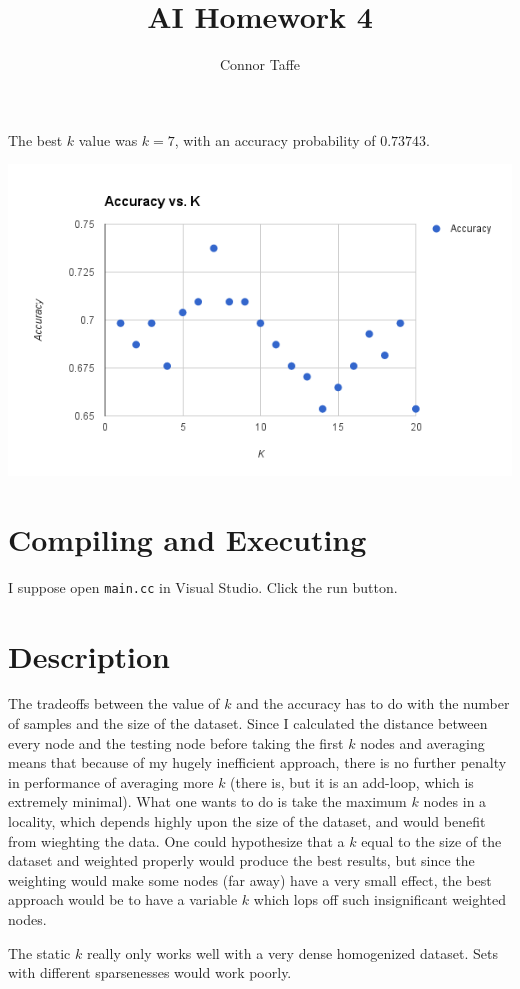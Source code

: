 \documentclass{article}
\title{AI Homework 4}
\author{Connor Taffe}
\begin{document}
  \maketitle

  The best $k$ value was $k=7$, with an accuracy probability of $0.73743$.

  {\centering\includegraphics[width=\textwidth]{image}}

  \section{Compiling and Executing}

  I suppose open {\tt main.cc} in Visual Studio. Click the run button.

  \section{Description}

  The tradeoffs between the value of $k$ and the accuracy has to do with the number of samples and the size of the dataset. Since I calculated the distance between every node and the testing node before taking the first $k$ nodes and averaging means that because of my hugely inefficient approach, there is no further penalty in performance of averaging more $k$ (there is, but it is an add-loop, which is extremely minimal). What one wants to do is take the maximum $k$ nodes in a locality, which depends highly upon the size of the dataset, and would benefit from wieghting the data. One could hypothesize that a $k$ equal to the size of the dataset and weighted properly would produce the best results, but since the weighting would make some nodes (far away) have a very small effect, the best approach would be to have a variable $k$ which lops off such insignificant weighted nodes.

  The static $k$ really only works well with a very dense homogenized dataset. Sets with different sparsenesses would work poorly.
\end{document}
